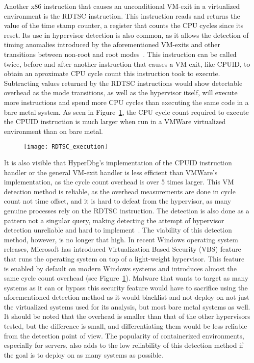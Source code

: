 Another x86 instruction that causes an unconditional VM-exit in a virtualized environment is the RDTSC instruction. This instruction reads and returns the value of the time stamp counter, 
a register that counts the CPU cycles since its reset. Its use in hypervisor detection is also common, as it allows the detection of timing anomalies introduced by the aforementioned VM-exits 
and other transitions between non-root and root modes~\cite{hyperdbg-transparency}. This instruction can be called twice, before and after another instruction that causes a VM-exit, like CPUID, to obtain an aproximate CPU
cycle count this instruction took to execute. Subtracting values returned by the RDTSC instructions would show detectable overhead as the mode transitions, as well as the hypervisor itself, 
will execute more instructions and spend more CPU cycles than executing the same code in a bare metal system. 
As seen in Figure~\ref{fig:rdtsc_overhead}, the CPU cycle count required to execute the CPUID instruction is much larger when run in a VMWare virtualized environment than on bare metal. 
\begin{figure}[tbp]
    \texttt{[image: RDTSC\_execution]} %
    \label{fig:rdtsc_overhead}
\end{figure}

It is also visible that HyperDbg's implementation of the CPUID instruction handler or the general VM-exit handler is less efficient than VMWare's implementation, as the cycle count overhead is over 5 times larger. 
This VM detection method is reliable, as the overhead measurements are done in cycle count not time offset, and it is hard to defeat from the hypervisor, as many genuine processes rely on the RDTSC 
instruction. The detection is also done as a pattern not a singular query, making detecting the attempt of hypervisor detection unreliable and hard to implement~\cite{hypervisor-detection-timing-attacks}. 
The viability of this detection method, however, is no longer that high. In recent Windows operating system releases, Microsoft has introduced Virtualization Based Security (VBS) feature~\cite{windows-vbs} 
that runs the operating system on top of a light-weight hypervisor. This feature is enabled by default on modern Windows systems and introduces almost the same cycle count overhead (see Figure~\ref{fig:rdtsc_overhead}). 
Malware that wants to target as many systems as it can or bypass this security feature would have to sacrifice using the aforementioned detection method as it would blacklist and not deploy on not just the virtualized systems used for its analysis, 
but most bare metal systems as well. It should be noted that the overhead is smaller than that of the other hypervisors tested, but the difference is small, and differentiating them would be less reliable from the detection point of view.
The popularity of containerized environments, especially for servers, also adds to the low reliability of this detection method if the goal is to deploy on as many systems as possible.

